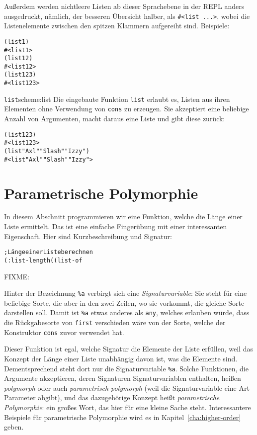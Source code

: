 Außerdem werden nichtleere Listen ab dieser Sprachebene in der REPL
anders ausgedruckt, nämlich, der besseren Übersicht halber, als
\verb|#<list ...>|,
wobei die Listenelemente zwischen den spitzen Klammern aufgereiht sind.
Beispiele:

\begin{alltt}
(list 1)
\evalsto{} #<list 1>
(list 1 2)
\evalsto{} #<list 1 2>
(list 1 2 3)
\evalsto{} #<list 1 2 3>
\end{alltt}
%
\begin{feature}{\texttt{list}}{scheme:list}
  Die eingebaute Funktion \texttt{list} erlaubt es, Listen aus ihren Elementen
  ohne Verwendung von \texttt{cons} zu erzeugen.  Sie
  akzeptiert eine beliebige Anzahl von Argumenten, macht daraus eine
  Liste und gibt diese zurück:
%
\begin{alltt}
(list 1 2 3)
\evalsto{} #<list 1 2 3>
(list "Axl" "Slash" "Izzy")
\evalsto{} #<list "Axl" "Slash" "Izzy">
\end{alltt}
\end{feature}


\section{Parametrische Polymorphie}
\label{sec:parametric-polymorphism}
\label{sec:more-lists}

In diesem Abschnitt programmieren wir eine Funktion, welche die Länge
einer Liste ermittelt. Das ist
eine einfache Fingerübung mit einer interessanten Eigenschaft.  Hier
sind Kurzbeschreibung und Signatur:
%
\begin{alltt}
; Länge einer Liste berechnen
(: list-length ((list-of %a) -> natural))
\end{alltt}
%
FIXME:

Hinter der Bezeichnung \verb$%a$ verbirgt sich eine 
\emph{Signaturvariable}: Sie
steht für eine beliebige Sorte, die aber in den zwei Zeilen, wo sie vorkommt,
die gleiche Sorte darstellen soll.  Damit ist \verb$%a$ etwas anderes als
\texttt{any}, welches erlauben würde, dass die Rückgabesorte von \texttt{first}
verschieden wäre von der Sorte, welche der Konstruktor \texttt{cons} zuvor
verwendet hat.


Dieser Funktion ist egal, welche Signatur
die Elemente der Liste erfüllen, weil das Konzept der Länge einer
Liste unabhängig davon ist, was die Elemente sind.
Dementsprechend steht dort nur die Signaturvariable \verb|%a|.
Solche Funktionen, die Argumente akzeptieren, deren Signaturen
Signaturvariablen enthalten, heißen \textit{polymorph} oder auch
\textit{parametrisch polymorph} (weil die Signaturvariable eine Art
Parameter abgibt), und das dazugehörige Konzept heißt
\textit{parametrische
  Polymorphie}:
ein großes Wort, das hier für eine kleine Sache steht.  Interessantere
Beispiele für parametrische Polymorphie wird es in
Kapitel~\ref{cha:higher-order} geben.

